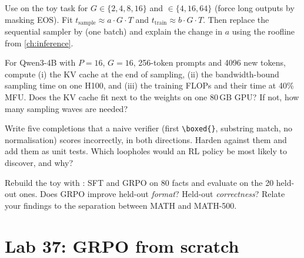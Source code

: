 \begin{exercise}
Use  on the toy task for $G\in\{2,4,8,16\}$ and
$\in\{4,16,64\}$ (force long outputs by masking EOS). Fit
$t_{\text{sample}}\approx a\cdot G\cdot T$ and $t_{\text{train}}\approx b\cdot G\cdot T$. Then
replace the sequential sampler by  (one batch) and explain the change
in $a$ using the roofline from \cref{ch:inference}.
\end{exercise}

\begin{exercise}
For Qwen3-4B with $P=16$, $G=16$, 256-token prompts and 4096 new tokens, compute (i) the KV
cache at the end of sampling, (ii) the bandwidth-bound sampling time on one H100, and (iii) the
training FLOPs and their time at 40\% MFU. Does the KV cache fit next to the weights on one
80\,GB GPU? If not, how many sampling waves are needed?
\end{exercise}

\begin{exercise}
Write five completions that a naive verifier (first \verb|\boxed{}|, substring
match, no normalisation) scores incorrectly, in both directions. Harden
 against them and add them as unit tests. Which loopholes would an RL
policy be most likely to discover, and why?
\end{exercise}

\begin{exercise}
Rebuild the toy with : SFT and GRPO on 80 facts and
evaluate on the 20 held-out ones. Does GRPO improve held-out \emph{format}? Held-out
\emph{correctness}? Relate your findings to the separation between MATH and MATH-500.
\end{exercise}

\section{Lab 37: GRPO from scratch}\label{sec:grpo:lab}

